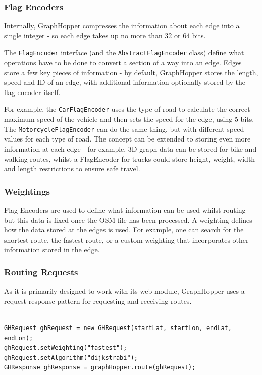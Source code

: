 \documentclass[ %
                    author={Alexander Hill},
                supervisor={Dr. Benjamin Sach},
                    degree={MEng},
                     title={MARMOSET},
                  subtitle={Multi-Agent Route Management using Online Simulation for Efficient Transportation},
                      type={research},
                      year={2016} ]{dissertation}
\begin{document}
\subsubsection{Flag Encoders}

Internally, GraphHopper compresses the information about each edge into a single
integer - so each edge takes up no more than 32 or 64 bits.

The \texttt{FlagEncoder} interface (and the \texttt{AbstractFlagEncoder} class)
define what operations have to be done to convert a section of a way into an
edge. Edges store a few key pieces of information - by default, GraphHopper
stores the length, speed and ID of an edge, with additional information
optionally stored by the flag encoder itself.

For example, the \texttt{CarFlagEncoder} uses the type of road to calculate the
correct maximum speed of the vehicle and then sets the speed for the edge, using
5 bits. The \texttt{MotorcycleFlagEncoder} can do the same thing, but with
different speed values for each type of road. The concept can be extended to
storing even more information at each edge - for example, 3D graph data can be
stored for bike and walking routes, whilst a FlagEncoder for trucks could store
height, weight, width and length restrictions to ensure safe travel.

\subsubsection{Weightings}\label{sec:gh-weighting}

Flag Encoders are used to define what information can be used whilst routing -
but this data is fixed once the OSM file has been processed. A weighting defines
how the data stored at the edges is used. For example, one can search for the
shortest route, the fastest route, or a custom weighting that incorporates other
information stored in the edge.

\subsubsection{Routing Requests}

As it is primarily designed to work with its web module, GraphHopper uses a
request-response pattern for requesting and receiving routes.

\begin{lstlisting}[label=lst:gh-route,caption={GraphHopper request and response}]

GHRequest ghRequest = new GHRequest(startLat, startLon, endLat, endLon);
ghRequest.setWeighting("fastest");
ghRequest.setAlgorithm("dijkstrabi");
GHResponse ghResponse = graphHopper.route(ghRequest);

\end{lstlisting}
\end{document}
